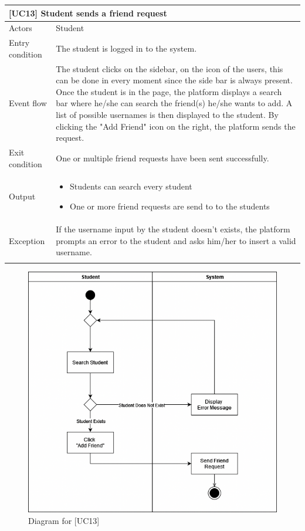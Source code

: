 \documentclass[12pt,oneside,a4paper]{article}
\begin{document}
\clearpage

\begin{table}[htbp]
\begin{tabular}{|l|p{12cm}|}
    \hline
    \multicolumn{2}{|l|}{\textbf{[UC13] Student sends a friend request}}\\
    \hline
    Actors & Student\\
    \hline
    Entry condition & The student is logged in to the system.\\
    \hline
    Event flow & The student clicks on the sidebar, on the icon of the users, this can be done in every moment since the side bar is always present. Once the student is in the page, the platform displays a search bar where he/she can search the friend(s) he/she wants to add. A list of possible usernames is then displayed to the student. By clicking the "Add Friend" icon on the right, the platform sends the request.\\
    \hline
    Exit condition & One or multiple friend requests have been sent successfully.\\
    \hline
    Output & \begin{itemize}
        \item Students can search every student
        \item One or more friend requests are send to to the students
    \end{itemize}\\
    \hline
    Exception & If the username input by the student doesn't exists, the platform prompts an error to the student and asks him/her to insert a valid username.\\
    \lasthline
\end{tabular}
\end{table}

\clearpage

\begin{figure}[htbp]
    \centering
    \includegraphics[width=1\linewidth]{Images/Diagrams/FriendRequest.png}
    \caption{Diagram for [UC13]}
    \label{fig:enter-label}
\end{figure}
\end{document}
